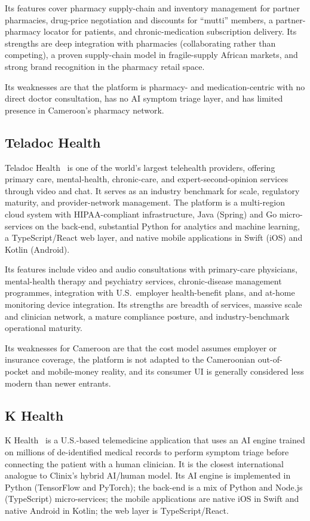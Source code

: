 Its features cover pharmacy supply-chain and inventory management for partner pharmacies, drug-price negotiation and discounts for ``mutti'' members, a partner-pharmacy locator for patients, and chronic-medication subscription delivery. Its strengths are deep integration with pharmacies (collaborating rather than competing), a proven supply-chain model in fragile-supply African markets, and strong brand recognition in the pharmacy retail space.

Its weaknesses are that the platform is pharmacy- and medication-centric with no direct doctor consultation, has no AI symptom triage layer, and has limited presence in Cameroon's pharmacy network.

\subsection{Teladoc Health}

Teladoc Health~\cite{teladoc} is one of the world's largest telehealth providers, offering primary care, mental-health, chronic-care, and expert-second-opinion services through video and chat. It serves as an industry benchmark for scale, regulatory maturity, and provider-network management. The platform is a multi-region cloud system with HIPAA-compliant infrastructure, Java (Spring) and Go micro-services on the back-end, substantial Python for analytics and machine learning, a TypeScript/React web layer, and native mobile applications in Swift (iOS) and Kotlin (Android).

Its features include video and audio consultations with primary-care physicians, mental-health therapy and psychiatry services, chronic-disease management programmes, integration with U.S.\ employer health-benefit plans, and at-home monitoring device integration. Its strengths are breadth of services, massive scale and clinician network, a mature compliance posture, and industry-benchmark operational maturity.

Its weaknesses for Cameroon are that the cost model assumes employer or insurance coverage, the platform is not adapted to the Cameroonian out-of-pocket and mobile-money reality, and its consumer UI is generally considered less modern than newer entrants.

\subsection{K Health}

K Health~\cite{k_health} is a U.S.-based telemedicine application that uses an AI engine trained on millions of de-identified medical records to perform symptom triage before connecting the patient with a human clinician. It is the closest international analogue to Clinix's hybrid AI/human model. Its AI engine is implemented in Python (TensorFlow and PyTorch); the back-end is a mix of Python and Node.js (TypeScript) micro-services; the mobile applications are native iOS in Swift and native Android in Kotlin; the web layer is TypeScript/React.

